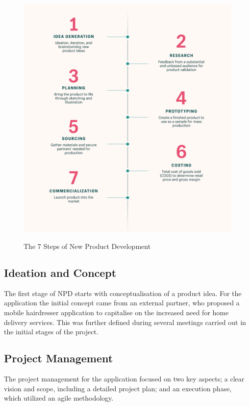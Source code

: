 \documentclass[12pt]{article}
\begin{document}
	\begin{figure}[H]
		\centering
		\includegraphics[scale=0.15]{images/npd.png}
		\caption{The 7 Steps of New Product Development}
		\label{fig:npd} \cite{shopifyWhatProductDevelopment}
	\end{figure}
	
	
	\subsection{Ideation and Concept}
	The first stage of NPD starts with conceptualisation of a product idea. For the application the initial concept came from an external partner, who proposed a mobile hairdresser application to capitalise on the increased need for home delivery services. This was further defined during several meetings carried out in the initial stages of the project.
	\\
	
	\subsection{Project Management}

	The project management for the application focused on two key aspects; a clear vision and scope, including a detailed project plan; and an execution phase, which utilized an agile methodology.
	
\end{document}

